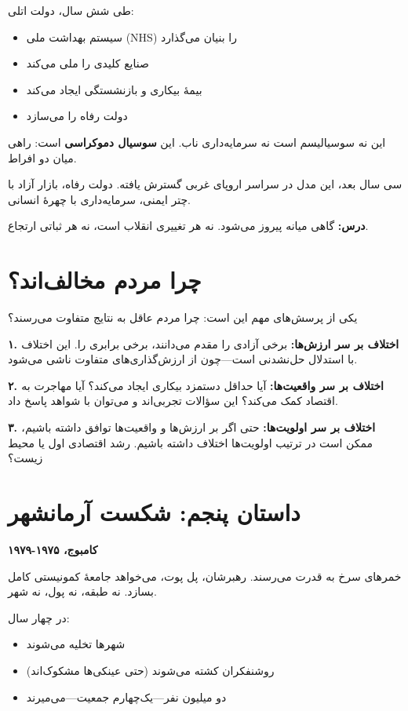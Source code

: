 طی شش سال، دولت اتلی:
\begin{itemize}
    \item سیستم بهداشت ملی (NHS) را بنیان می‌گذارد
    \item صنایع کلیدی را ملی می‌کند
    \item بیمهٔ بیکاری و بازنشستگی ایجاد می‌کند
    \item دولت رفاه را می‌سازد
\end{itemize}

این نه سوسیالیسم است نه سرمایه‌داری ناب. این \textbf{سوسیال دموکراسی} است: راهی میان دو افراط.

سی سال بعد، این مدل در سراسر اروپای غربی گسترش یافته. دولت رفاه، بازار آزاد با چتر ایمنی، سرمایه‌داری با چهرهٔ انسانی.

\textbf{درس:} گاهی میانه پیروز می‌شود. نه هر تغییری انقلاب است، نه هر ثباتی ارتجاع.

\section*{چرا مردم مخالف‌اند؟}

یکی از پرسش‌های مهم این است: چرا مردم عاقل به نتایج متفاوت می‌رسند؟

\begin{tcolorbox}[
    enhanced,
    colback=violet!10,
    colframe=violet,
    boxrule=1.5pt,
    arc=5pt,
    fonttitle=\bfseries,
    title={\rl{سه منبع اختلاف}}
]
\textbf{۱. اختلاف بر سر ارزش‌ها:}
برخی آزادی را مقدم می‌دانند، برخی برابری را. این اختلاف با استدلال حل‌نشدنی است—چون از ارزش‌گذاری‌های متفاوت ناشی می‌شود.

\textbf{۲. اختلاف بر سر واقعیت‌ها:}
آیا حداقل دستمزد بیکاری ایجاد می‌کند؟ آیا مهاجرت به اقتصاد کمک می‌کند؟ این سؤالات تجربی‌اند و می‌توان با شواهد پاسخ داد.

\textbf{۳. اختلاف بر سر اولویت‌ها:}
حتی اگر بر ارزش‌ها و واقعیت‌ها توافق داشته باشیم، ممکن است در ترتیب اولویت‌ها اختلاف داشته باشیم. رشد اقتصادی اول یا محیط زیست؟
\end{tcolorbox}

\section*{داستان پنجم: شکست آرمانشهر}

\textbf{کامبوج، ۱۹۷۵-۱۹۷۹}

خمرهای سرخ به قدرت می‌رسند. رهبرشان، پل پوت، می‌خواهد جامعهٔ کمونیستی کامل بسازد. نه طبقه، نه پول، نه شهر.

در چهار سال:
\begin{itemize}
    \item شهرها تخلیه می‌شوند
    \item روشنفکران کشته می‌شوند (حتی عینکی‌ها مشکوک‌اند)
    \item دو میلیون نفر—یک‌چهارم جمعیت—می‌میرند
\end{itemize}

